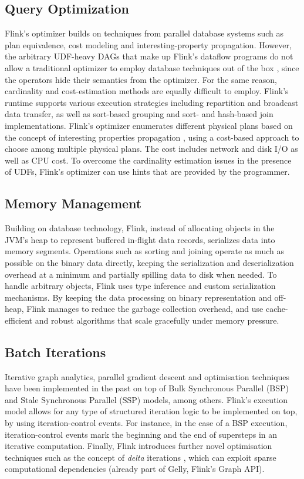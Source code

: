 \documentclass[11pt]{article}
\begin{document}
\subsection{Query Optimization} 
Flink's optimizer builds on techniques from parallel database systems such as plan equivalence, cost modeling and interesting-property propagation. However, the arbitrary UDF-heavy DAGs that make up Flink's dataflow programs do not allow a traditional optimizer to employ database techniques out of the box \cite{blackBoxes}, since the operators hide their semantics from the optimizer. For the same reason, cardinality and cost-estimation methods are equally difficult to employ. Flink's runtime supports various execution strategies including repartition and broadcast data transfer, as well as sort-based grouping and sort- and hash-based join implementations. Flink's optimizer enumerates different physical plans based on the concept of interesting properties propagation \cite{scopeOptimizer}, using a cost-based approach to choose among multiple physical plans. The cost includes network and disk I/O as well as CPU cost. To overcome the cardinality estimation issues in the presence of UDFs, Flink's optimizer can use hints that are provided by the programmer.

\subsection{Memory Management} Building on database technology, Flink, instead of allocating objects in the JVM’s heap to represent buffered in-flight data records, serializes data into memory segments. Operations such as sorting and joining operate as much as possible on the binary data directly, keeping the serialization and deserialization overhead at a minimum and partially spilling data to disk when needed. To handle arbitrary objects, Flink uses type inference and  custom serialization mechanisms.  By keeping the data processing on binary representation and off-heap, Flink manages to reduce the garbage collection overhead, and use cache-efficient and robust algorithms that scale gracefully under memory pressure.

\subsection{Batch Iterations}
\label{sec:batch-iterations}
Iterative graph analytics, parallel gradient descent and optimisation techniques have been implemented in the past on top of Bulk Synchronous Parallel (BSP) and Stale Synchronous Parallel (SSP) models, among others. Flink's execution model allows for any type of structured iteration logic to be implemented on top, by using iteration-control events. For instance, in the case of a BSP execution, iteration-control events mark the beginning and the end of supersteps in an iterative computation. Finally, Flink introduces further novel optimisation techniques such as the concept of \emph{delta} iterations \cite{DBLP:journals/pvldb/EwenTKM12}, which can exploit sparse computational dependencies (already part of Gelly, Flink's Graph API).  
\end{document}
